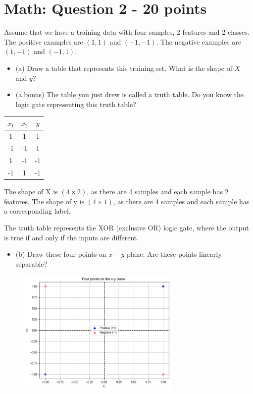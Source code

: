 \documentclass[11pt]{article}
\begin{document}
	\section*{Math: Question 2 - 20 points}
	
	Assume that we have a training data with four samples, 2 features and 2 classes. The positive examples are $(1,1)$ and $(-1,-1)$. The negative examples are $(1,-1)$ and $(-1,1)$.
	
	\begin{itemize}
		\item (a) Draw a table that represents this training set. What is the shape of $X$ and $y$?
		\item (a.bonus) The table you just drew is called a truth table. Do you know the logic gate representing this truth table?
	\end{itemize}
	
	\begin{center}
		\begin{tabular}{|c|c|c|}
			\hline
			$x_{1}$ & $x_{2}$ & $y$ \\
			\hline
			1 & 1 & 1 \\
			-1 & -1 & 1 \\
			1 & -1 & -1 \\
			-1 & 1 & -1 \\
			\hline
		\end{tabular}
	\end{center}
	
	The shape of $\mathrm{X}$ is $(4 \times 2)$, as there are 4 samples and each sample has 2 features. The shape of $\mathrm{y}$ is $(4 \times 1)$, as there are 4 samples and each sample has a corresponding label.
	
	The truth table represents the XOR (exclusive OR) logic gate, where the output is true if and only if the inputs are different.
	
	\begin{itemize}
		\item (b) Draw these four points on $x-y$ plane. Are these points linearly separable?
	\end{itemize}
	
	
	\begin{figure}[H]
		\centering
		\includegraphics[width=0.7\textwidth]{figures/figure3.png}
	\end{figure}
	
\end{document}
